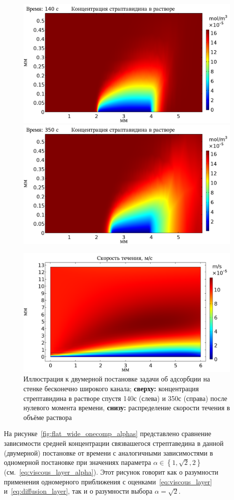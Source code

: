 \documentclass[oneside,final,12pt]{extreport}
\begin{document}
\begin{figure}
  \centering
  \includegraphics[width=.5\textwidth]{pic/flat_wide_onecomp_plate_concentration_140s}%
  \includegraphics[width=.5\textwidth]{pic/flat_wide_onecomp_plate_concentration_350s}

  \includegraphics[width=.6\textwidth]{pic/flat_wide_onecomp_plate_velocity}

  \caption{\label{fig:flat_wide_plate_illustration}%
    Иллюстрация к двумерной постановке задачи об адсорбции
    на стенке бесконечно широкого канала;
    \textbf{сверху:} концентрация стрептавидина в растворе
    спустя 140с (слева) и 350с (справа) после нулевого момента времени,
    \textbf{снизу:} распределение скорости течения в объёме раствора
  }
\end{figure}

На рисунке~\ref{fig:flat_wide_onecomp_alphas}
представлено сравнение зависимости средней концентрации
связвашегося стрептаведина в данной (двумерной) постановке
от времени с аналогичными зависимостями в одномерной постановке
при значениях параметра
$\alpha \in \left\{ 1, \sqrt{2}, 2 \right\}$
(см.~\eqref{eq:viscous_layer_alpha}).
Этот рисунок говорит как о разумности применения одномерного приближения
с оценками~\eqref{eq:viscous_layer} и~\eqref{eq:diffusion_layer},
так и о разумности выбора $\alpha = \sqrt{2}$.
\end{document}
